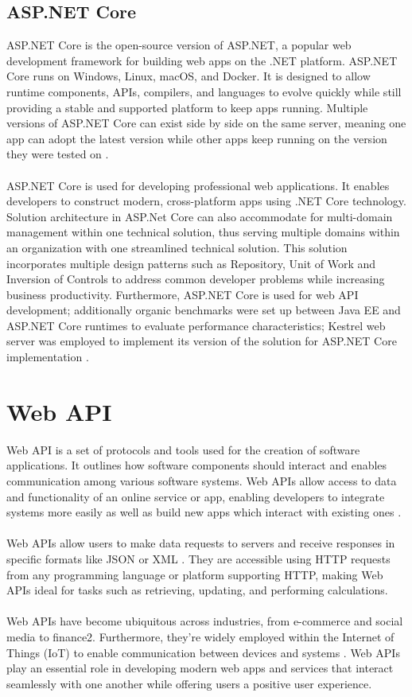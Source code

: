 \documentclass[BIF,Bachelor,nenglish]{twbook}%
\begin{document}
\subsection{ASP.NET Core}
ASP.NET Core is the open-source version of ASP.NET, a popular web development framework for building web apps on the .NET platform. ASP.NET Core runs on Windows, Linux, macOS, and Docker. It is designed to allow runtime components, \ac{API}s, compilers, and languages to evolve quickly while still providing a stable and supported platform to keep apps running. Multiple versions of ASP.NET Core can exist side by side on the same server, meaning one app can adopt the latest version while other apps keep running on the version they were tested on \cite{dotnetaspcore}.
\\
\\
ASP.NET Core is used for developing professional web applications. It enables developers to construct modern, cross-platform apps using .NET Core technology. Solution architecture in ASP.Net Core can also accommodate for multi-domain management within one technical solution, thus serving multiple domains within an organization with one streamlined technical solution. This solution incorporates multiple design patterns such as Repository, Unit of Work and Inversion of Controls to address common developer problems while increasing business productivity. Furthermore, ASP.NET Core is used for web \ac{API} development; additionally organic benchmarks were set up between Java EE and ASP.NET Core runtimes to evaluate performance characteristics; Kestrel web server was employed to implement its version of the solution for ASP.NET Core implementation \cite{kro2018}.

\section{Web \ac{API}}
Web \ac{API} is a set of protocols and tools used for the creation of software applications. It outlines how software components should interact and enables communication among various software systems. Web \ac{API}s allow access to data and functionality of an online service or app, enabling developers to integrate systems more easily as well as build new apps which interact with existing ones \cite{soh2015}.
\\
\\
Web \ac{API}s allow users to make data requests to servers and receive responses in specific formats like JSON or XML \cite{tan2016}. They are accessible using \ac{HTTP} requests from any programming language or platform supporting \ac{HTTP}, making Web \ac{API}s ideal for tasks such as retrieving, updating, and performing calculations.
\\
\\
Web \ac{API}s have become ubiquitous across industries, from e-commerce and social media to finance2. Furthermore, they're widely employed within the Internet of Things (IoT) to enable communication between devices and systems \cite{tan2016}. Web \ac{API}s play an essential role in developing modern web apps and services that interact seamlessly with one another while offering users a positive user experience.
\end{document}
